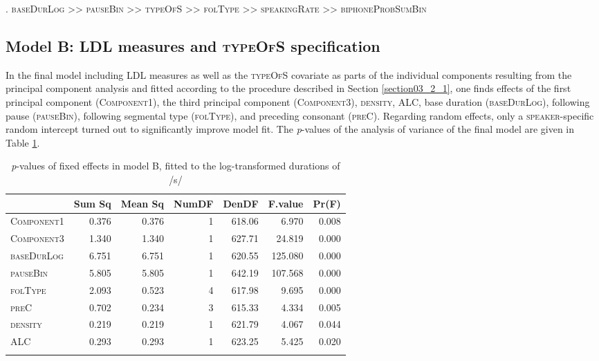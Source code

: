 \ex.
\label{ex:5.1}
\textsc{baseDurLog} >> \textsc{pauseBin} >> \textsc{typeOfS} >> \textsc{folType} >> \textsc{speakingRate} >> \textsc{biphoneProbSumBin}

\subsection{Model B: LDL measures and \textsc{typeOfS} specification}\label{section05_3_2}

In the final model including LDL measures as well as the \textsc{typeOfS} covariate as parts of the individual components resulting from the principal component analysis and fitted according to the procedure described in Section \ref{section03_2_1}, one finds effects of the first principal component (\textsc{Component1}), the third principal component (\textsc{Component3}), \textsc{density}, \textsc{ALC}, base duration (\textsc{baseDurLog}), following pause (\textsc{pauseBin}), following segmental type (\textsc{folType}), and preceding consonant (\textsc{preC}). Regarding random effects, only a \textsc{speaker}-specific random intercept turned out to significantly improve model fit. The \textit{p}-values of the analysis of variance of the final model are given in Table \ref{tab:5.8}.

\begin{table}\fontsize{10}{11}
\caption{\textit{p}-values of fixed effects in model B, fitted to the log-transformed durations of /s/}
\label{tab:5.8}
\centering
\begin{tabular}{lrrrrrr} 
\lsptoprule
~          & Sum Sq & Mean Sq & NumDF & DenDF  & F.value & Pr(F)  \\ 
\midrule
\textsc{Component1} & 0.376  & 0.376   & 1     & 618.06 & 6.970   & 0.008  \\
\textsc{Component3} & 1.340  & 1.340   & 1     & 627.71 & 24.819  & 0.000  \\
\textsc{baseDurLog} & 6.751  & 6.751   & 1     & 620.55 & 125.080 & 0.000  \\
\textsc{pauseBin}   & 5.805  & 5.805   & 1     & 642.19 & 107.568 & 0.000  \\
\textsc{folType}    & 2.093  & 0.523   & 4     & 617.98 & 9.695   & 0.000  \\
\textsc{preC}       & 0.702  & 0.234   & 3     & 615.33 & 4.334   & 0.005  \\
\textsc{density}    & 0.219  & 0.219   & 1     & 621.79 & 4.067   & 0.044  \\
\textsc{ALC}        & 0.293  & 0.293   & 1     & 623.25 & 5.425   & 0.020  \\
\lspbottomrule
\end{tabular}
\end{table}

